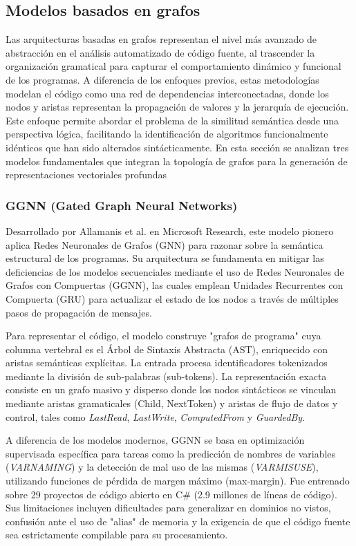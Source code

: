 \subsection{Modelos basados en grafos}

Las arquitecturas basadas en grafos representan el nivel más avanzado de abstracción en el análisis automatizado de código fuente, al trascender la organización gramatical para capturar el comportamiento dinámico y funcional de los programas. A diferencia de los enfoques previos, estas metodologías modelan el código como una red de dependencias interconectadas, donde los nodos y aristas representan la propagación de valores y la jerarquía de ejecución. Este enfoque permite abordar el problema de la similitud semántica desde una perspectiva lógica, facilitando la identificación de algoritmos funcionalmente idénticos que han sido alterados sintácticamente. En esta sección se analizan tres modelos fundamentales que integran la topología de grafos para la generación de representaciones vectoriales profundas

\subsubsection{GGNN (Gated Graph Neural Networks)}

Desarrollado por Allamanis et al. en Microsoft Research, este modelo pionero aplica Redes Neuronales de Grafos (GNN) para razonar sobre la semántica estructural de los programas. Su arquitectura se fundamenta en mitigar las deficiencias de los modelos secuenciales mediante el uso de Redes Neuronales de Grafos con Compuertas (GGNN), las cuales emplean Unidades Recurrentes con Compuerta (GRU) para actualizar el estado de los nodos a través de múltiples pasos de propagación de mensajes.

Para representar el código, el modelo construye "grafos de programa" cuya columna vertebral es el Árbol de Sintaxis Abstracta (AST), enriquecido con aristas semánticas explícitas. La entrada procesa identificadores tokenizados mediante la división de sub-palabras (sub-tokens). La representación exacta consiste en un grafo masivo y disperso donde los nodos sintácticos se vinculan mediante aristas gramaticales (Child, NextToken) y aristas de flujo de datos y control, tales como \textit{LastRead}, \textit{LastWrite}, \textit{ComputedFrom} y \textit{GuardedBy}.

A diferencia de los modelos modernos, GGNN se basa en optimización supervisada específica para tareas como la predicción de nombres de variables (\textit{VARNAMING}) y la detección de mal uso de las mismas (\textit{VARMISUSE}), utilizando funciones de pérdida de margen máximo (max-margin). Fue entrenado sobre 29 proyectos de código abierto en C\# (2.9 millones de líneas de código). Sus limitaciones incluyen dificultades para generalizar en dominios no vistos, confusión ante el uso de "alias" de memoria y la exigencia de que el código fuente sea estrictamente compilable para su procesamiento.



